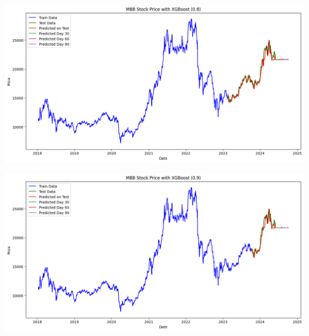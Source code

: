 \documentclass[conference]{IEEEtran}
\begin{document}
\begin{minipage}{0.21\textwidth}
    \centering
    \includegraphics[width=\linewidth]{images/XGBoost/XGBoost_MBB_82.png}
    \label{fig:image1}
\end{minipage}
\hfill
\begin{minipage}{0.21\textwidth}
    \centering
    \includegraphics[width=\linewidth]{images/XGBoost/XGBoost_MBB_91.png}
    \label{fig:image2}
\end{minipage}
\end{document}
